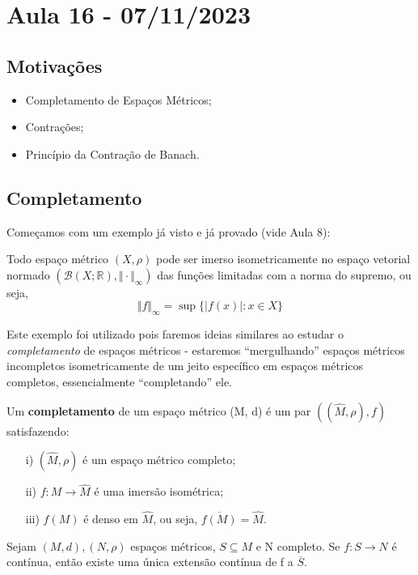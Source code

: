 \documentclass[MetricSpaces/metric_notes.tex]{subfiles}
\begin{document}
\section{Aula 16 - 07/11/2023}
\subsection{Motivações}
\begin{itemize}
	\item Completamento de Espaços Métricos;
	\item Contrações;
	\item Princípio da Contração de Banach.
\end{itemize}
\subsection{Completamento}
Começamos com um exemplo já visto e já provado (vide Aula 8):
\begin{example}
	Todo espaço métrico \((X, \rho )\) pode ser imerso isometricamente no espaço vetorial normado \((\mathcal{B}(X;\mathbb{R}), \Vert \cdot \Vert_{\infty})\) das funções
	limitadas com a norma do supremo, ou seja,
	\[
		\Vert f \Vert_{\infty} = \sup\{|f(x)|: x\in X\}
	\]
\end{example}
Este exemplo foi utilizado pois faremos ideias similares ao estudar o \textit{completamento} de espaços métricos - estaremos ``mergulhando'' espaços métricos incompletos
isometricamente de um jeito específico em espaços métricos completos, essencialmente ``completando'' ele.
\begin{def*}
	Um \textbf{completamento} de um espaço métrico (M, d) é um par \(((\hat{M}, \rho ), f)\) satisfazendo:
	\begin{itemize}
		\item[i)] \((\hat{M}, \rho )\) é um espaço métrico completo;
		\item[ii)] \(f:M\rightarrow \hat{M}\) é uma imersão isométrica;
		\item[iii)] \(f(M)\) é denso em \(\hat{M}\), ou seja, \(\overline{f(M)} = \hat{M}\).
	\end{itemize}
\end{def*}
\begin{lemma*}
	Sejam \((M, d), (N, \rho )\) espaços métricos, \(S\subseteq{M}\) e N completo. Se \(f:S\rightarrow N\) é contínua, então existe uma única extensão contínua de f a \(\overline{S}.\)
\end{lemma*}
\end{document}
